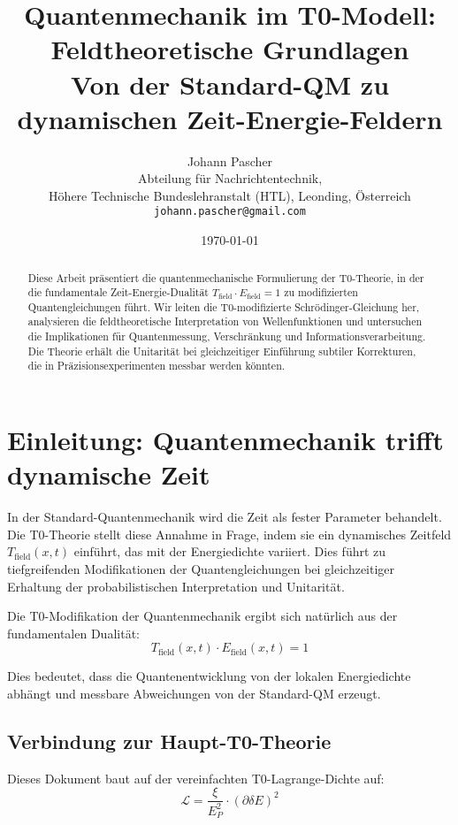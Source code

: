 \documentclass[12pt,a4paper]{article}
\title{Quantenmechanik im T0-Modell: \\
Feldtheoretische Grundlagen \\
\large Von der Standard-QM zu dynamischen Zeit-Energie-Feldern}
\author{Johann Pascher\\
Abteilung f{\"u}r Nachrichtentechnik, \\H{\"o}here Technische Bundeslehranstalt (HTL), Leonding, {\"O}sterreich\\
\texttt{johann.pascher@gmail.com}}
\date{\today}
\newcommand{\deltaE}{\delta E}
\newcommand{\Lag}{\mathcal{L}}
\newcommand{\xipar}{\xi}
\newcommand{\EPlanck}{E_P}
\theoremstyle{definition}
\theoremstyle{remark}
\begin{document}
\maketitle

\begin{abstract}
	Diese Arbeit pr{\"a}sentiert die quantenmechanische Formulierung der T0-Theorie, in der die fundamentale Zeit-Energie-Dualit{\"a}t $T_{\text{field}} \cdot E_{\text{field}} = 1$ zu modifizierten Quantengleichungen f{\"u}hrt. Wir leiten die T0-modifizierte Schr{\"o}dinger-Gleichung her, analysieren die feldtheoretische Interpretation von Wellenfunktionen und untersuchen die Implikationen f{\"u}r Quantenmessung, Verschr{\"a}nkung und Informationsverarbeitung. Die Theorie erh{\"a}lt die Unitarit{\"a}t bei gleichzeitiger Einf{\"u}hrung subtiler Korrekturen, die in Pr{\"a}zisionsexperimenten messbar werden k{\"o}nnten.
\end{abstract}

\tableofcontents
\newpage

\section{Einleitung: Quantenmechanik trifft dynamische Zeit}

In der Standard-Quantenmechanik wird die Zeit als fester Parameter behandelt. Die T0-Theorie stellt diese Annahme in Frage, indem sie ein dynamisches Zeitfeld $T_{\text{field}}(x,t)$ einf{\"u}hrt, das mit der Energiedichte variiert. Dies f{\"u}hrt zu tiefgreifenden Modifikationen der Quantengleichungen bei gleichzeitiger Erhaltung der probabilistischen Interpretation und Unitarit{\"a}t.

\begin{tcolorbox}[colback=blue!5!white,colframe=blue!75!black,title=Zentrale Erkenntnis]
	Die T0-Modifikation der Quantenmechanik ergibt sich nat{\"u}rlich aus der fundamentalen Dualit{\"a}t:
	$$T_{\text{field}}(x,t) \cdot E_{\text{field}}(x,t) = 1$$
	
	Dies bedeutet, dass die Quantenentwicklung von der lokalen Energiedichte abh{\"a}ngt und messbare Abweichungen von der Standard-QM erzeugt.
\end{tcolorbox}

\subsection{Verbindung zur Haupt-T0-Theorie}

Dieses Dokument baut auf der vereinfachten T0-Lagrange-Dichte auf:
\begin{equation}
	\Lag = \frac{\xipar}{\EPlanck^2} \cdot (\partial \deltaE)^2
\end{equation}
\end{document}
